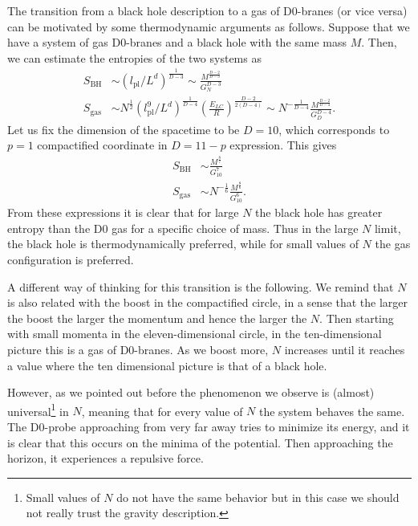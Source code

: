 \documentclass[11pt,english]{article}
\numberwithin{equation}{section}
\begin{document}
  The transition from a black hole description to a gas of D0-branes (or vice versa) can be motivated by some thermodynamic arguments as follows. Suppose that we have a system of gas D0-branes and a black hole with the same mass $M$. Then, we can estimate the entropies of the two systems as \cite{Horowitz1997}
  \begin{align}
  S_{\text{BH}}&\sim\left(l_{\text{pl}}/L^d\right)^{\frac{1}{D-3}}\sim \frac{M^{\frac{D-2}{D-3}}}{G_N^{D-3}}\\
  S_{\text{gas}}&\sim N^{\frac{1	}{2}}\left(l_{\text{pl}}^9/L^d\right)^{\frac{1}{D-4}}\left(\frac{E_{LC}}{R}\right)^{\frac{D-2}{2(D-4)}}\sim N^{-\frac{1}{D-4}}\frac{M^{\frac{D-2}{D-4}}}{G_D^{D-4}}.
  \end{align}
  Let us fix the dimension of the spacetime to be $D=10$, which corresponds to $p=1$ compactified coordinate in $D=11-p$ expression. This gives 
  \begin{align}
  S_{\text{BH}}&\sim \frac{M^{\frac{8}{7}}}{G_{10}^7}\\
  S_{\text{gas}}&\sim N^{-\frac{1}{6}}\frac{M^{\frac{8}{6}}}{G_{10}^{6}}.
  \end{align}
  From these expressions it is clear that for large $N$ the black hole has greater entropy than the D0 gas for a specific choice of mass. Thus in the large $N$ limit, the black hole is thermodynamically preferred, while for small values of $N$ the gas configuration is preferred. %
  
  \noindent
  A different way of thinking for this transition is the following. We remind that $N$ is also related with the boost in the compactified circle, in a sense that the larger the boost the larger the momentum and hence the larger the $N$. Then starting with small momenta in the eleven-dimensional circle, in the ten-dimensional picture this is a gas of D0-branes. As we boost more, $N$ increases until it reaches a value where the ten dimensional picture is that of a black hole.
  \noindent
  
  However, as we pointed out before the phenomenon we observe is (almost) universal\footnote{Small values of $N$ do not have the same behavior but in this case we should not really trust the gravity description.} in $N$, meaning that for every value of $N$ the system behaves the same. The D0-probe approaching from very far away tries to minimize its energy, and it is clear that this occurs on the minima of the potential. Then approaching the horizon, it experiences a repulsive force. 
  
\end{document}
